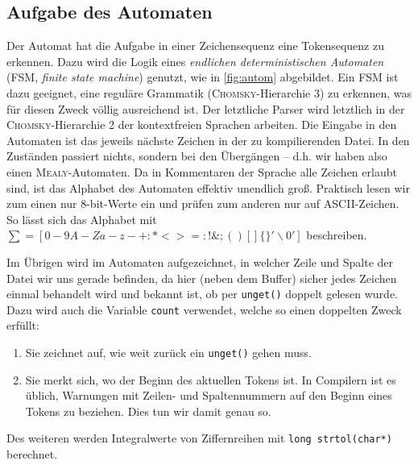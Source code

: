 \documentclass[
a4paper,   %
11pt,      %
oneside,   %
onecolumn, %
final      %
]{article}
\newcommand{\code}[1]{\lstinline$#1$}
\begin{document}
\subsection{Aufgabe des Automaten}
Der Automat hat die Aufgabe in einer Zeichensequenz eine Tokensequenz zu erkennen.
Dazu wird die Logik eines \emph{endlichen deterministischen Automaten} (FSM, \emph{finite state machine}) genutzt, wie in \ref{fig:autom} abgebildet.
Ein FSM ist dazu geeignet, eine reguläre Grammatik (\textsc{Chomsky}-Hierarchie 3) zu erkennen, was für diesen Zweck völlig ausreichend ist. Der letztliche Parser wird letztlich in der \textsc{Chomsky}-Hierarchie 2 der kontextfreien Sprachen arbeiten.
Die Eingabe in den Automaten ist das jeweils nächste Zeichen in der zu kompilierenden Datei.
In den Zuständen passiert nichts, sondern bei den Übergängen -- d.h. wir haben also einen \textsc{Mealy}-Automaten.
Da in Kommentaren der Sprache alle Zeichen erlaubt sind, ist das Alphabet des Automaten effektiv unendlich groß.
Praktisch lesen wir zum einen nur 8-bit-Werte ein und prüfen zum anderen nur auf ASCII-Zeichen.
So lässt sich das Alphabet mit $\sum = [0-9A-Za-z-+:*<>=:!\&;()[]\{\}'\backslash0']$ beschreiben.

Im Übrigen wird im Automaten aufgezeichnet, in welcher Zeile und Spalte der Datei wir uns gerade befinden, da hier (neben dem Buffer) sicher jedes Zeichen einmal behandelt wird und bekannt ist, ob per \code{unget()} doppelt gelesen wurde. Dazu wird auch die Variable \code{count} verwendet, welche so einen doppelten Zweck erfüllt:
\begin{enumerate}
\item Sie zeichnet auf, wie weit zurück ein \code{unget()} gehen muss.
\item Sie merkt sich, wo der Beginn des aktuellen Tokens ist. In Compilern ist es üblich, Warnungen mit Zeilen- und Spaltennummern auf den Beginn eines Tokens zu beziehen. Dies tun wir damit genau so.
\end{enumerate}

Des weiteren werden Integralwerte von Ziffernreihen mit \code{long strtol(char*)} berechnet.
\end{document}
